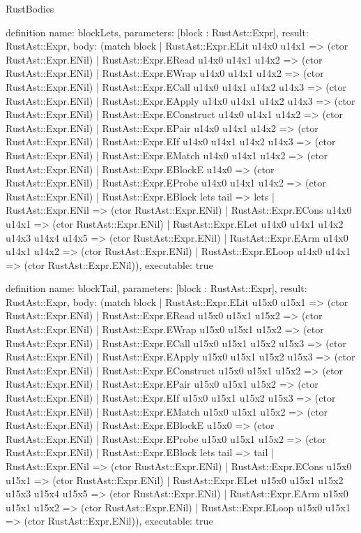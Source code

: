 \begin{lexlean}{RustBodies}
\begin{semanticmodule}
definition{
  name: blockLets,
  parameters: [block : RustAst::Expr],
  result: RustAst::Expr,
  body: (match block
    | RustAst::Expr.ELit u14x0 u14x1 => (ctor RustAst::Expr.ENil)
    | RustAst::Expr.ERead u14x0 u14x1 u14x2 => (ctor RustAst::Expr.ENil)
    | RustAst::Expr.EWrap u14x0 u14x1 u14x2 => (ctor RustAst::Expr.ENil)
    | RustAst::Expr.ECall u14x0 u14x1 u14x2 u14x3 => (ctor RustAst::Expr.ENil)
    | RustAst::Expr.EApply u14x0 u14x1 u14x2 u14x3 => (ctor RustAst::Expr.ENil)
    | RustAst::Expr.EConstruct u14x0 u14x1 u14x2 => (ctor RustAst::Expr.ENil)
    | RustAst::Expr.EPair u14x0 u14x1 u14x2 => (ctor RustAst::Expr.ENil)
    | RustAst::Expr.EIf u14x0 u14x1 u14x2 u14x3 => (ctor RustAst::Expr.ENil)
    | RustAst::Expr.EMatch u14x0 u14x1 u14x2 => (ctor RustAst::Expr.ENil)
    | RustAst::Expr.EBlockE u14x0 => (ctor RustAst::Expr.ENil)
    | RustAst::Expr.EProbe u14x0 u14x1 u14x2 => (ctor RustAst::Expr.ENil)
    | RustAst::Expr.EBlock lets tail => lets
    | RustAst::Expr.ENil => (ctor RustAst::Expr.ENil)
    | RustAst::Expr.ECons u14x0 u14x1 => (ctor RustAst::Expr.ENil)
    | RustAst::Expr.ELet u14x0 u14x1 u14x2 u14x3 u14x4 u14x5 => (ctor RustAst::Expr.ENil)
    | RustAst::Expr.EArm u14x0 u14x1 u14x2 => (ctor RustAst::Expr.ENil)
    | RustAst::Expr.ELoop u14x0 u14x1 => (ctor RustAst::Expr.ENil)),
  executable: true
}

definition{
  name: blockTail,
  parameters: [block : RustAst::Expr],
  result: RustAst::Expr,
  body: (match block
    | RustAst::Expr.ELit u15x0 u15x1 => (ctor RustAst::Expr.ENil)
    | RustAst::Expr.ERead u15x0 u15x1 u15x2 => (ctor RustAst::Expr.ENil)
    | RustAst::Expr.EWrap u15x0 u15x1 u15x2 => (ctor RustAst::Expr.ENil)
    | RustAst::Expr.ECall u15x0 u15x1 u15x2 u15x3 => (ctor RustAst::Expr.ENil)
    | RustAst::Expr.EApply u15x0 u15x1 u15x2 u15x3 => (ctor RustAst::Expr.ENil)
    | RustAst::Expr.EConstruct u15x0 u15x1 u15x2 => (ctor RustAst::Expr.ENil)
    | RustAst::Expr.EPair u15x0 u15x1 u15x2 => (ctor RustAst::Expr.ENil)
    | RustAst::Expr.EIf u15x0 u15x1 u15x2 u15x3 => (ctor RustAst::Expr.ENil)
    | RustAst::Expr.EMatch u15x0 u15x1 u15x2 => (ctor RustAst::Expr.ENil)
    | RustAst::Expr.EBlockE u15x0 => (ctor RustAst::Expr.ENil)
    | RustAst::Expr.EProbe u15x0 u15x1 u15x2 => (ctor RustAst::Expr.ENil)
    | RustAst::Expr.EBlock lets tail => tail
    | RustAst::Expr.ENil => (ctor RustAst::Expr.ENil)
    | RustAst::Expr.ECons u15x0 u15x1 => (ctor RustAst::Expr.ENil)
    | RustAst::Expr.ELet u15x0 u15x1 u15x2 u15x3 u15x4 u15x5 => (ctor RustAst::Expr.ENil)
    | RustAst::Expr.EArm u15x0 u15x1 u15x2 => (ctor RustAst::Expr.ENil)
    | RustAst::Expr.ELoop u15x0 u15x1 => (ctor RustAst::Expr.ENil)),
  executable: true
}


\end{semanticmodule}
\end{lexlean}

